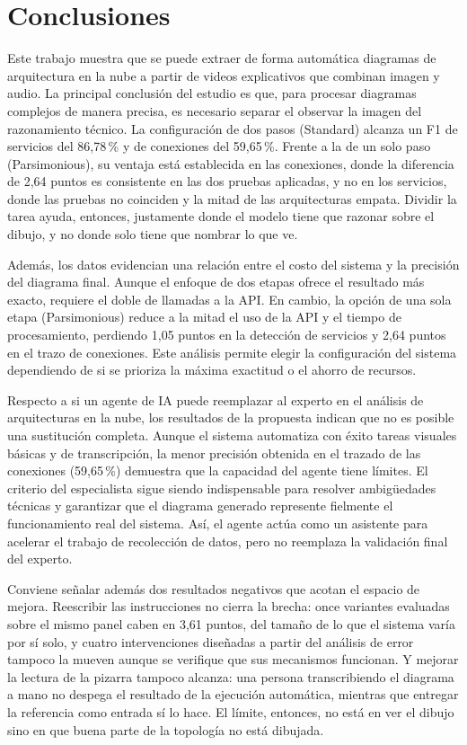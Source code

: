 \documentclass[a4paper, twocolumn, 10pt]{IEEEtran}
\begin{document}
 
 
\section{Conclusiones}
Este trabajo muestra que se puede extraer de forma automática diagramas de arquitectura en la nube a partir de videos explicativos que combinan imagen y audio. La principal conclusión del estudio es que, para procesar diagramas complejos de manera precisa, es necesario separar el observar la imagen del razonamiento técnico. La configuración de dos pasos (Standard) alcanza un F1 de servicios del 86,78\,\% y de conexiones del 59,65\,\%. Frente a la de un solo paso (Parsimonious), su ventaja está establecida en las conexiones, donde la diferencia de 2,64 puntos es consistente en las dos pruebas aplicadas, y no en los servicios, donde las pruebas no coinciden y la mitad de las arquitecturas empata. Dividir la tarea ayuda, entonces, justamente donde el modelo tiene que razonar sobre el dibujo, y no donde solo tiene que nombrar lo que ve.
 
Además, los datos evidencian una relación entre el costo del sistema y la precisión del diagrama final. Aunque el enfoque de dos etapas ofrece el resultado más exacto, requiere el doble de llamadas a la API. En cambio, la opción de una sola etapa (Parsimonious) reduce a la mitad el uso de la API y el tiempo de procesamiento, perdiendo 1,05 puntos en la detección de servicios y 2,64 puntos en el trazo de conexiones. Este análisis permite elegir la configuración del sistema dependiendo de si se prioriza la máxima exactitud o el ahorro de recursos.
 
Respecto a si un agente de IA puede reemplazar al experto en el análisis de arquitecturas en la nube, los resultados de la propuesta indican que no es posible una sustitución completa. Aunque el sistema automatiza con éxito tareas visuales básicas y de transcripción, la menor precisión obtenida en el trazado de las conexiones (59,65\,\%) demuestra que la capacidad del agente tiene límites. El criterio del especialista sigue siendo indispensable para resolver ambigüedades técnicas y garantizar que el diagrama generado represente fielmente el funcionamiento real del sistema. Así, el agente actúa como un asistente para acelerar el trabajo de recolección de datos, pero no reemplaza la validación final del experto.
 
Conviene señalar además dos resultados negativos que acotan el espacio de mejora. Reescribir las instrucciones no cierra la brecha: once variantes evaluadas sobre el mismo panel caben en 3,61 puntos, del tamaño de lo que el sistema varía por sí solo, y cuatro intervenciones diseñadas a partir del análisis de error tampoco la mueven aunque se verifique que sus mecanismos funcionan. Y mejorar la lectura de la pizarra tampoco alcanza: una persona transcribiendo el diagrama a mano no despega el resultado de la ejecución automática, mientras que entregar la referencia como entrada sí lo hace. El límite, entonces, no está en ver el dibujo sino en que buena parte de la topología no está dibujada.
 
\end{document}
